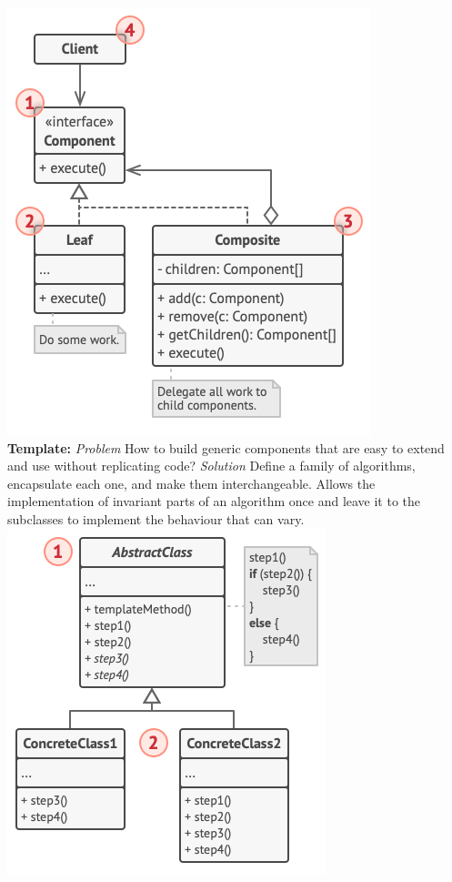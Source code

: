 \includegraphics[width=\linewidth]{figs/composite.png}\\
\textbf{Template:} \textit{Problem} How to build generic components that are easy to extend and use without replicating code?
\textit{Solution} Define a family of algorithms, encapsulate each one, and make them interchangeable. Allows the implementation of invariant parts of an algorithm once and leave it to the subclasses to implement the behaviour that can vary.\\
\includegraphics[width=\linewidth]{figs/template.png}\\
